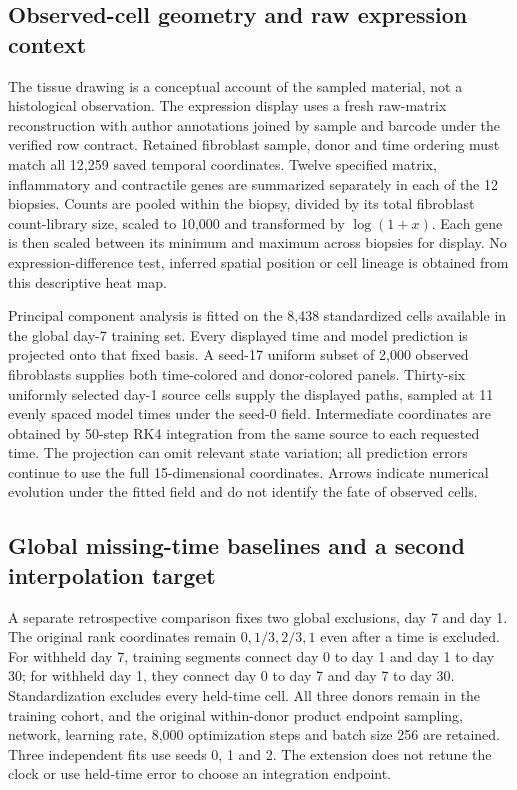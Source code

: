 \subsection{Observed-cell geometry and raw expression context}
The tissue drawing is a conceptual account of the sampled material, not a histological observation. The expression display uses a fresh raw-matrix reconstruction with author annotations joined by sample and barcode under the verified row contract. Retained fibroblast sample, donor and time ordering must match all 12,259 saved temporal coordinates. Twelve specified matrix, inflammatory and contractile genes are summarized separately in each of the 12 biopsies. Counts are pooled within the biopsy, divided by its total fibroblast count-library size, scaled to 10,000 and transformed by $\log(1+x)$. Each gene is then scaled between its minimum and maximum across biopsies for display. No expression-difference test, inferred spatial position or cell lineage is obtained from this descriptive heat map.

Principal component analysis is fitted on the 8,438 standardized cells available in the global day-7 training set. Every displayed time and model prediction is projected onto that fixed basis. A seed-17 uniform subset of 2,000 observed fibroblasts supplies both time-colored and donor-colored panels. Thirty-six uniformly selected day-1 source cells supply the displayed paths, sampled at 11 evenly spaced model times under the seed-0 field. Intermediate coordinates are obtained by 50-step RK4 integration from the same source to each requested time. The projection can omit relevant state variation; all prediction errors continue to use the full 15-dimensional coordinates. Arrows indicate numerical evolution under the fitted field and do not identify the fate of observed cells.

\subsection{Global missing-time baselines and a second interpolation target}
A separate retrospective comparison fixes two global exclusions, day 7 and day 1. The original rank coordinates remain $0,1/3,2/3,1$ even after a time is excluded. For withheld day 7, training segments connect day 0 to day 1 and day 1 to day 30; for withheld day 1, they connect day 0 to day 7 and day 7 to day 30. Standardization excludes every held-time cell. All three donors remain in the training cohort, and the original within-donor product endpoint sampling, network, learning rate, 8,000 optimization steps and batch size 256 are retained. Three independent fits use seeds 0, 1 and 2. The extension does not retune the clock or use held-time error to choose an integration endpoint.

